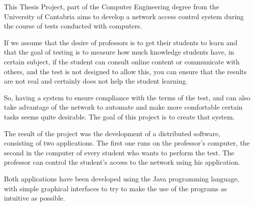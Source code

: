 This Thesis Project, part of the Computer Engineering degree from the University of Cantabria aims to develop a network access control system during the course of tests conducted with computers.
\newline

If we assume that the desire of professors is to get their students to learn and that the goal of testing is to measure how much knowledge students have, in certain subject, if the student can consult online content or communicate with others, and the test is not designed to allow this, you can ensure that the results are not real and certainly does not help the student learning.
\newline

So, having a system to ensure compliance with the terms of the test, and can also take advantage of the network to automate and make more comfortable certain tasks seems quite desirable. The goal of this project is to create that system.
\newline


The result of the project was the development of a distributed software, consisting of two applications. The first one runs on the professor's computer, the second in the computer of every student who wants to perform the test. The professor can control the student's access to the network using his application.
\newline


Both applications have been developed using the Java programming language, with simple graphical interfaces to try to make the use of the programs as intuitive as possible.
